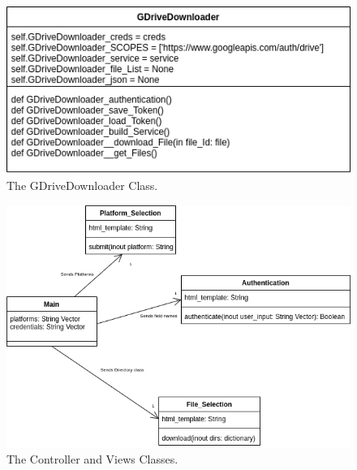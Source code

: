 \documentclass{article}
\begin{document}
\begin{figure}[p]
\includegraphics[scale=.5]{des_google}
\centering
\caption{The GDriveDownloader Class.}
\end{figure}

\begin{figure}[p]
\includegraphics[scale=.5]{tmp}
\centering
\caption{The Controller and Views Classes.}
\end{figure}




%
%









\end{document}
